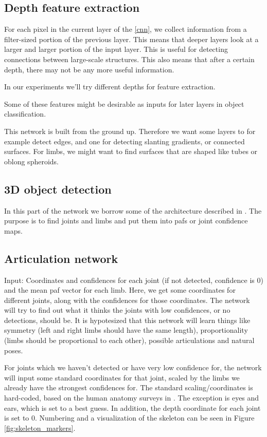 \subsection{Depth feature extraction}\label{subsec:depth_feature}
For each pixel in the current layer of the \ref{cnn}, we collect information from a filter-sized portion of the previous layer. This means that deeper layers look at a larger and larger portion of the input layer. This is useful for detecting connections between large-scale structures. This also means that after a certain depth, there may not be any more useful information.

In our experiments we'll try different depths for feature extraction.

Some of these features might be desirable as inputs for later layers in object classification.

This network is built from the ground up. Therefore we want some layers to for example detect edges, and one for detecting slanting gradients, or connected surfaces. For limbs, we might want to find surfaces that are shaped like tubes or oblong spheroids.

\subsection{3D object detection}\label{subsec:obj_detect}
In this part of the network we borrow some of the architecture described in \cite{cao2017realtime}. The purpose is to find joints and limbs and put them into \gls{paf}s or joint confidence maps. 

\subsection{Articulation network}\label{subsec:articulation}
Input: Coordinates and confidences for each joint (if not detected, confidence is 0) and the mean \gls{paf} vector for each limb.
Here, we get some coordinates for different joints, along with the confidences for those coordinates. The network will try to find out what it thinks the joints with low confidences, or no detections, should be. It is hypotesized that this network will learn things like symmetry (left and right limbs should have the same length), proportionality (limbs should be proportional to each other), possible articulations and natural poses.

For joints which we haven't detected or have very low confidence for, the network will input some standard coordinates for that joint, scaled by the limbs we already have the strongest confidences for. The standard scaling/coordinates is hard-coded, based on the human anatomy surveys in \cite{bodySegmentParams}. The exception is eyes and ears, which is set to a best guess. In addition, the depth coordinate for each joint is set to 0. Numbering and a visualization of the skeleton can be seen in Figure \ref{fig:skeleton_markers}.

